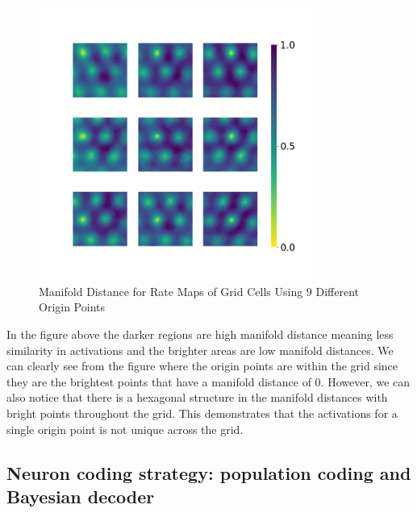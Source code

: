 \documentclass[12pt, letterpaper]{article}
\begin{document}
\begin{figure}[H]
    \centering
    \includegraphics[width=0.8\textwidth]{rate_map_manifold_distance.png}
    \caption{Manifold Distance for Rate Maps of Grid Cells Using $9$ Different Origin Points}
    \label{fig:rate_map_manifold_distance}
\end{figure}

In the figure above the darker regions are high manifold distance meaning less similarity in activations and the brighter areas are low manifold distances. We can clearly see from the figure where the origin points are within the grid since they are the brightest points that have a manifold distance of $0$. However, we can also notice that there is a hexagonal structure in the manifold distances with bright points throughout the grid. This demonstrates that the activations for a single origin point is not unique across the grid. 



\subsection{Neuron coding strategy: population coding and Bayesian decoder}
\end{document}
